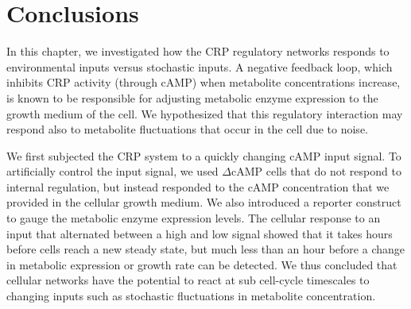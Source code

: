 








\section{Conclusions}

In this chapter, 
we investigated how the CRP regulatory networks responds to environmental inputs versus stochastic inputs.
%
A negative feedback loop, which inhibits CRP activity (through cAMP) 
when metabolite concentrations increase,
is known to be responsible for adjusting metabolic enzyme expression to the growth medium of the cell.
%
We hypothesized that this regulatory interaction may respond also to metabolite fluctuations that occur in the cell due to noise. 




We first subjected the CRP system to a quickly changing cAMP input signal. 
To artificially control the input signal, we used $\Delta$cAMP cells that do not respond to internal regulation, but instead responded to the cAMP concentration that we provided in the cellular growth medium.
We also introduced a reporter construct to gauge the metabolic enzyme expression levels.
%
The cellular response to an input that alternated between a high and low signal showed that 
it takes hours before cells reach a new steady state, but much less than an hour before a change in metabolic expression or growth rate can be detected.
%
We thus concluded that cellular networks have the potential to react at sub cell-cycle timescales to changing inputs such as stochastic fluctuations in metabolite concentration.



